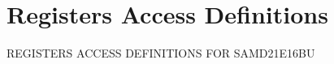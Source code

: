 \hypertarget{group___s_a_m_d21_e16_b_u__reg}{}\section{Registers Access Definitions}
\label{group___s_a_m_d21_e16_b_u__reg}
R\+E\+G\+I\+S\+T\+E\+RS A\+C\+C\+E\+SS D\+E\+F\+I\+N\+I\+T\+I\+O\+NS F\+OR S\+A\+M\+D21\+E16\+BU 